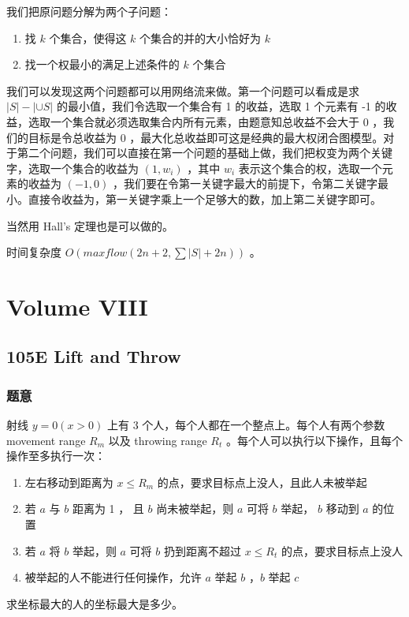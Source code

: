 \documentclass[11pt]{article}
\begin{document}
    我们把原问题分解为两个子问题：
\begin{enumerate}
\item 找 $k$ 个集合，使得这 $k$ 个集合的并的大小恰好为 $k$
\item 找一个权最小的满足上述条件的 $k$ 个集合
\end{enumerate}

    我们可以发现这两个问题都可以用网络流来做。第一个问题可以看成是求 $|S| - |\cup S|$ 的最小值，我们令选取一个集合有 1 的收益，选取 1 个元素有 -1 的收益，选取一个集合就必须选取集合内所有元素，由题意知总收益不会大于 0 ，我们的目标是令总收益为 0 ，最大化总收益即可这是经典的最大权闭合图模型。对于第二个问题，我们可以直接在第一个问题的基础上做，我们把权变为两个关键字，选取一个集合的收益为 $(1, w_i)$ ，其中 $w_i$ 表示这个集合的权，选取一个元素的收益为 $(-1, 0)$ ，我们要在令第一关键字最大的前提下，令第二关键字最小。直接令收益为，第一关键字乘上一个足够大的数，加上第二关键字即可。

    当然用 Hall's 定理也是可以做的。

    时间复杂度 $O(maxflow (2n + 2, \sum |S| + 2n))$ 。
\section{Volume VIII}
\label{sec-8}
\subsection{105E  Lift and Throw}
\label{sec-8-1}
\subsubsection{题意}
\label{sec-8-1-1}

    射线 $y = 0 (x > 0)$ 上有 3 个人，每个人都在一个整点上。每个人有两个参数 movement range $R_m$ 以及 throwing range $R_t$ 。每个人可以执行以下操作，且每个操作至多执行一次：
\begin{enumerate}
\item 左右移动到距离为 $x \leq R_m$ 的点，要求目标点上没人，且此人未被举起
\item 若 $a$ 与 $b$ 距离为 1 ， 且 $b$ 尚未被举起，则 $a$ 可将 $b$ 举起， $b$ 移动到 $a$ 的位置
\item 若 $a$ 将 $b$ 举起，则 $a$ 可将 $b$ 扔到距离不超过 $x \leq R_t$ 的点，要求目标点上没人
\item 被举起的人不能进行任何操作，允许 $a$ 举起 $b$ ，$b$ 举起 $c$
\end{enumerate}
    求坐标最大的人的坐标最大是多少。
\end{document}
